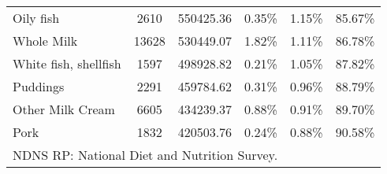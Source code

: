 \documentclass{bmcart}
\begin{document}
\begin{backmatter}
\begin{table}[h!]
\begin{tabular}{lccccc}
		Oily fish                                           & 2610  & 550425.36  & 0.35\%        & 1.15\%   & 85.67\%      \\
		Whole Milk                                          & 13628 & 530449.07  & 1.82\%        & 1.11\%   & 86.78\%      \\
		White fish, shellfish                               & 1597  & 498928.82  & 0.21\%        & 1.05\%   & 87.82\%      \\
		Puddings                                            & 2291  & 459784.62  & 0.31\%        & 0.96\%   & 88.79\%      \\
		Other Milk Cream                                    & 6605  & 434239.37  & 0.88\%        & 0.91\%   & 89.70\%      \\
		Pork                                                & 1832  & 420503.76  & 0.24\%        & 0.88\%   & 90.58\%     \\\hline
		\multicolumn{6}{l}{NDNS RP: National Diet and Nutrition Survey. }
	\end{tabular}
\end{table}



\end{backmatter}
\end{document}
